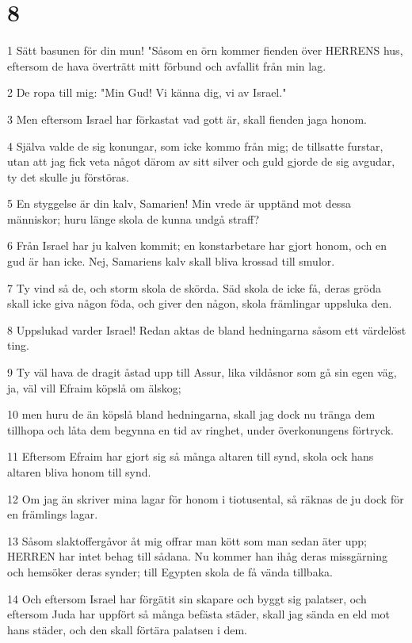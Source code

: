 \chapter{8}

\par 1 Sätt basunen för din mun! "Såsom en örn kommer fienden över HERRENS hus, eftersom de hava överträtt mitt förbund och avfallit från min lag.
\par 2 De ropa till mig: "Min Gud! Vi känna dig, vi av Israel."
\par 3 Men eftersom Israel har förkastat vad gott är, skall fienden jaga honom.
\par 4 Själva valde de sig konungar, som icke kommo från mig; de tillsatte furstar, utan att jag fick veta något därom av sitt silver och guld gjorde de sig avgudar, ty det skulle ju förstöras.
\par 5 En styggelse är din kalv, Samarien! Min vrede är upptänd mot dessa människor; huru länge skola de kunna undgå straff?
\par 6 Från Israel har ju kalven kommit; en konstarbetare har gjort honom, och en gud är han icke. Nej, Samariens kalv skall bliva krossad till smulor.
\par 7 Ty vind så de, och storm skola de skörda. Säd skola de icke få, deras gröda skall icke giva någon föda, och giver den någon, skola främlingar uppsluka den.
\par 8 Uppslukad varder Israel! Redan aktas de bland hedningarna såsom ett värdelöst ting.
\par 9 Ty väl hava de dragit åstad upp till Assur, lika vildåsnor som gå sin egen väg, ja, väl vill Efraim köpslå om älskog;
\par 10 men huru de än köpslå bland hedningarna, skall jag dock nu tränga dem tillhopa och låta dem begynna en tid av ringhet, under överkonungens förtryck.
\par 11 Eftersom Efraim har gjort sig så många altaren till synd, skola ock hans altaren bliva honom till synd.
\par 12 Om jag än skriver mina lagar för honom i tiotusental, så räknas de ju dock för en främlings lagar.
\par 13 Såsom slaktoffergåvor åt mig offrar man kött som man sedan äter upp; HERREN har intet behag till sådana. Nu kommer han ihåg deras missgärning och hemsöker deras synder; till Egypten skola de få vända tillbaka.
\par 14 Och eftersom Israel har förgätit sin skapare och byggt sig palatser, och eftersom Juda har uppfört så många befästa städer, skall jag sända en eld mot hans städer, och den skall förtära palatsen i dem.

